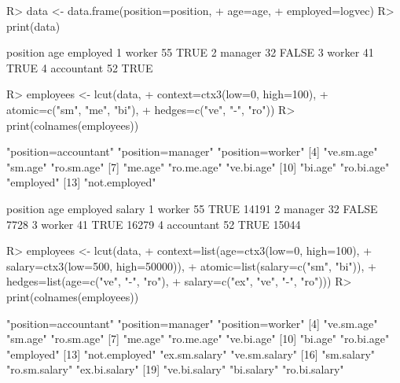 \documentclass{article}\usepackage[]{graphicx}\usepackage[]{color}
\begin{document}
\begin{Schunk}
% --begin: "lcut.data.frame"
\begin{Sinput}
R> data <- data.frame(position=position,
+                     age=age,
+                     employed=logvec)
R> print(data)
\end{Sinput}
\begin{Soutput}
    position age employed
1     worker  55     TRUE
2    manager  32    FALSE
3     worker  41     TRUE
4 accountant  52     TRUE
\end{Soutput}
\begin{Sinput}
R> employees <- lcut(data,
+       context=ctx3(low=0, high=100),
+       atomic=c("sm", "me", "bi"),
+       hedges=c("ve", "-", "ro"))
R> print(colnames(employees))
\end{Sinput}
\begin{Soutput}
 [1] "position=accountant" "position=manager"    "position=worker"    
 [4] "ve.sm.age"           "sm.age"              "ro.sm.age"          
 [7] "me.age"              "ro.me.age"           "ve.bi.age"          
[10] "bi.age"              "ro.bi.age"           "employed"           
[13] "not.employed"       
\end{Soutput}
%
% --end: "lcut.data.frame"
\end{Schunk}

\begin{Schunk}
% --begin: "lcut.data.frame2"
\begin{Soutput}
    position age employed salary
1     worker  55     TRUE  14191
2    manager  32    FALSE   7728
3     worker  41     TRUE  16279
4 accountant  52     TRUE  15044
\end{Soutput}
\begin{Sinput}
R> employees <- lcut(data,
+                    context=list(age=ctx3(low=0, high=100),
+                                 salary=ctx3(low=500, high=50000)),
+                    atomic=list(salary=c("sm", "bi")),
+                    hedges=list(age=c("ve", "-", "ro"),
+                                salary=c("ex", "ve", "-", "ro")))
R> print(colnames(employees))
\end{Sinput}
\begin{Soutput}
 [1] "position=accountant" "position=manager"    "position=worker"    
 [4] "ve.sm.age"           "sm.age"              "ro.sm.age"          
 [7] "me.age"              "ro.me.age"           "ve.bi.age"          
[10] "bi.age"              "ro.bi.age"           "employed"           
[13] "not.employed"        "ex.sm.salary"        "ve.sm.salary"       
[16] "sm.salary"           "ro.sm.salary"        "ex.bi.salary"       
[19] "ve.bi.salary"        "bi.salary"           "ro.bi.salary"       
\end{Soutput}
%
% --end: "lcut.data.frame2"
\end{Schunk}
\end{document}
